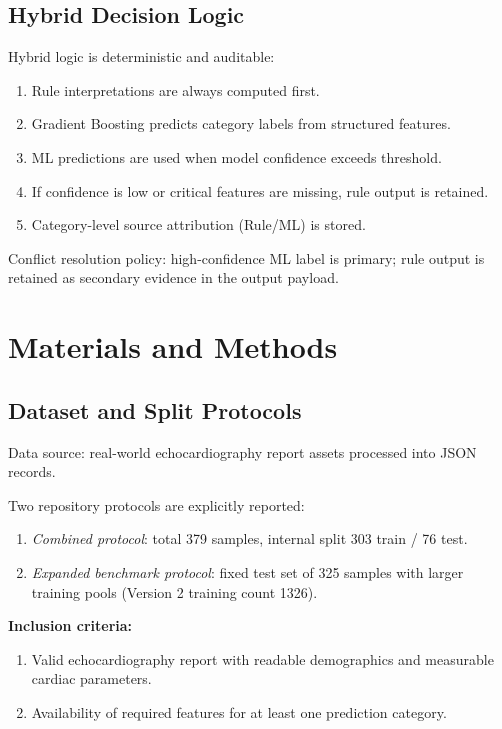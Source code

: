 \documentclass[10pt,twocolumn,letterpaper]{IEEEtran}
\begin{document}
\subsection{Hybrid Decision Logic}
Hybrid logic is deterministic and auditable:
\begin{enumerate}
\item Rule interpretations are always computed first.
\item Gradient Boosting predicts category labels from structured features.
\item ML predictions are used when model confidence exceeds threshold.
\item If confidence is low or critical features are missing, rule output is retained.
\item Category-level source attribution (Rule/ML) is stored.
\end{enumerate}

Conflict resolution policy: high-confidence ML label is primary; rule output is retained as secondary evidence in the output payload.

\section{Materials and Methods}

\subsection{Dataset and Split Protocols}
Data source: real-world echocardiography report assets processed into JSON records.

Two repository protocols are explicitly reported:
\begin{enumerate}
\item \textit{Combined protocol}: total 379 samples, internal split 303 train / 76 test.
\item \textit{Expanded benchmark protocol}: fixed test set of 325 samples with larger training pools (Version 2 training count 1326).
\end{enumerate}

\textbf{Inclusion criteria:}
\begin{enumerate}
\item Valid echocardiography report with readable demographics and measurable cardiac parameters.
\item Availability of required features for at least one prediction category.
\end{enumerate}
\end{document}

